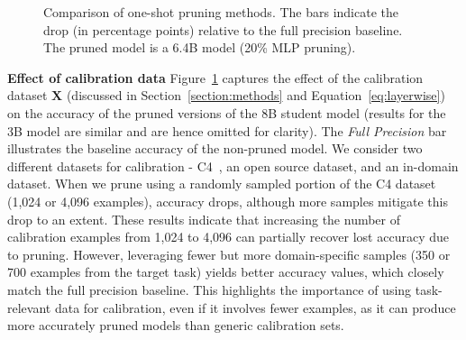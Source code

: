 \begin{figure}[t]
    \centering
    \caption{Comparison of one-shot pruning methods. The bars indicate the drop (in percentage points) relative to the full precision baseline. The pruned model is a 6.4B model (20\% MLP pruning).}
    \label{fig:calibration}
\end{figure}

\noindent \textbf{Effect of calibration data}
Figure~\ref{fig:calibration} captures the effect of the calibration dataset $\boldsymbol{X}$ (discussed in Section~\ref{section:methods} and Equation~\eqref{eq:layerwise}) on the accuracy of the pruned versions of the 8B student model (results for the 3B model are similar and are hence omitted for clarity). The \emph{Full Precision} bar illustrates the baseline accuracy of the non-pruned model. We consider two different datasets for calibration - C4~\cite{raffel2020exploring}, an open source dataset, and an in-domain dataset. When we prune using a randomly sampled portion of the C4 dataset (1,024 or 4,096 examples), accuracy drops, although more samples mitigate this drop to an extent. These results indicate that increasing the number of calibration examples from 1,024 to 4,096 can partially recover lost accuracy due to pruning. However, leveraging fewer but more domain-specific samples (350 or 700 examples from the target task) yields better accuracy values, which closely match the full precision baseline. This highlights the importance of using task-relevant data for calibration, even if it involves fewer examples, as it can produce more accurately pruned models than generic calibration sets.


